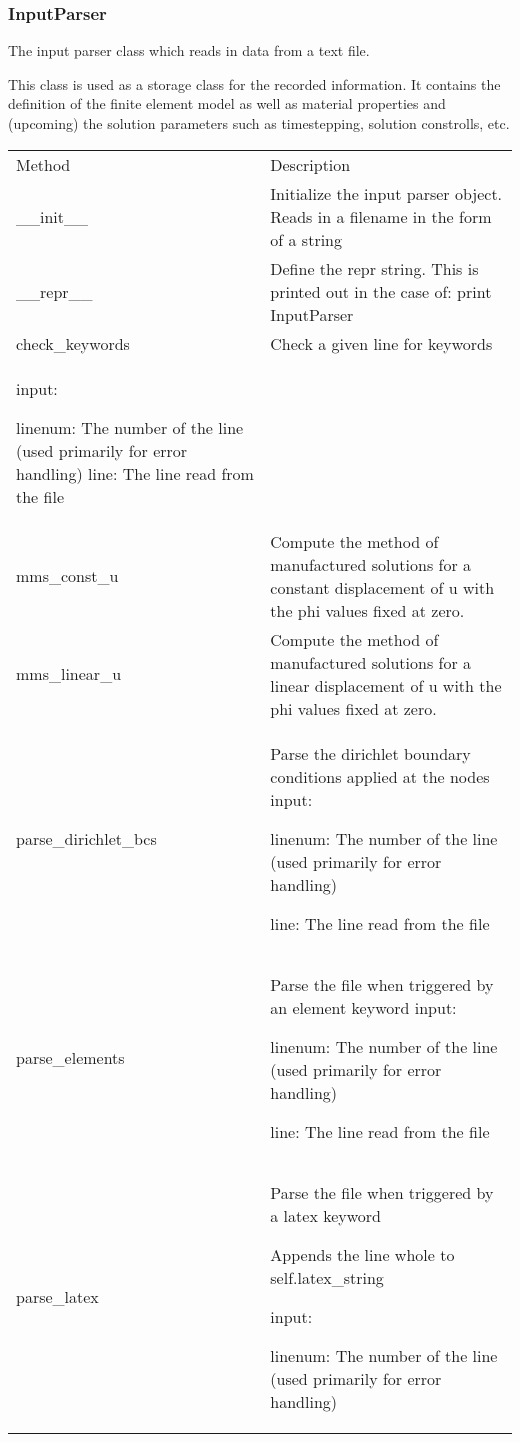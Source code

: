 \documentclass{asme2ej}
\begin{document}
\subsubsection{InputParser}

The input parser class which reads in data from a text file.

This class is used as a storage class for the recorded information. It contains the definition of the finite element model as well as material properties and (upcoming) the solution parameters such as timestepping, solution constrolls, etc.

\begin{longtable}{ p{}  p{} }
\hline
Method & Description\\
\_\_init\_\_ & Initialize the input parser object. Reads in a filename in the form of a string\\
\_\_repr\_\_ & Define the repr string. This is printed out in the case of: print InputParser\\
check\_keywords & Check a given line for keywords\\
input:

    linenum: The number of the line (used primarily for error handling)
    line:    The line read from the file\\
mms\_const\_u & Compute the method of manufactured solutions for a constant displacement of u with the phi values fixed at zero.\\
mms\_linear\_u & Compute the method of manufactured solutions for a linear displacement of u with the phi values fixed at zero.\\
parse\_dirichlet\_bcs & Parse the dirichlet boundary conditions applied at the nodes
input:

    linenum: The number of the line (used primarily for error handling)
    
    line:    The line read from the file\\
parse\_elements & Parse the file when triggered by an element keyword
input:

    linenum: The number of the line (used primarily for error handling)
    
    line:    The line read from the file\\
parse\_latex & Parse the file when triggered by a latex keyword

Appends the line whole to self.latex\_string

input:

    linenum: The number of the line (used primarily for error handling)
    

\end{longtable}
\end{document}
